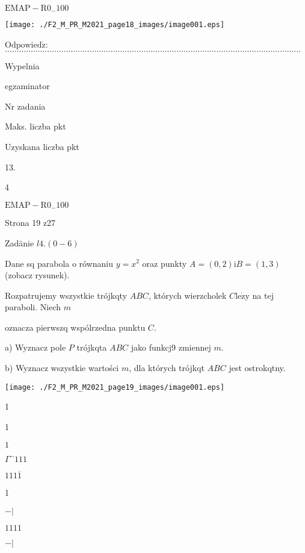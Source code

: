 \documentclass[a4paper,12pt]{article}
\begin{document}
$\mathrm{E}\mathrm{M}\mathrm{A}\mathrm{P}-\mathrm{R}0_{-}100$




\begin{center}
\texttt{[image: ./F2\_M\_PR\_M2021\_page18\_images/image001.eps]}
\end{center}
$\mathrm{O}\mathrm{d}\mathrm{p}\mathrm{o}\mathrm{w}\mathrm{i}\mathrm{e}\mathrm{d}\acute{\mathrm{z}}$:$\ldots\ldots\ldots\ldots\ldots\ldots\ldots\ldots\ldots\ldots\ldots\ldots\ldots\ldots\ldots\ldots\ldots\ldots\ldots\ldots\ldots\ldots\ldots\ldots\ldots\ldots\ldots\ldots\ldots\ldots\ldots\ldots\ldots\ldots\ldots\ldots\ldots\ldots\ldots\ldots\ldots\ldots$

Wypelnia

egzaminator

Nr zadania

Maks. liczba pkt

Uzyskana liczba pkt

13.

4

$\mathrm{E}\mathrm{M}\mathrm{A}\mathrm{P}-\mathrm{R}0_{-}100$

Strona 19 z27





Zadänie $l4. (0-6)$

Dane sq parabola o równaniu $y=x^{2}$ oraz punkty $A=(0,2) \mathrm{i} B=(1,3)$ (zobacz rysunek).

Rozpatrujemy wszystkie trójkqty $ABC$, których wierzcholek $C \mathrm{l}\mathrm{e}\dot{\mathrm{z}}\mathrm{y}$ na tej paraboli. Niech $m$

oznacza pierwszq wspólrzedna punktu $C.$

a) Wyznacz pole $P$ trójkqta $ABC$ jako funkcj9 zmiennej $m.$

b) Wyznacz wszystkie wartości $m$, dla których trójkqt $ABC$ jest ostrokqtny.
\begin{center}
\texttt{[image: ./F2\_M\_PR\_M2021\_page19\_images/image001.eps]}
\end{center}
1

1

$1$

$\Gamma^{\neg}111$

$111\overline{1}$

1

$-|$

$1111$

$-|$
\end{document}
